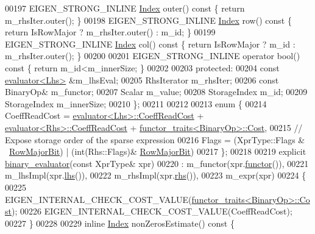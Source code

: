 \begin{DoxyCode}
00197     EIGEN\_STRONG\_INLINE \hyperlink{namespace_eigen_a62e77e0933482dafde8fe197d9a2cfde}{Index} outer()\textcolor{keyword}{ const }\{ \textcolor{keywordflow}{return} m\_rhsIter.outer(); \}
00198     EIGEN\_STRONG\_INLINE \hyperlink{namespace_eigen_a62e77e0933482dafde8fe197d9a2cfde}{Index} row()\textcolor{keyword}{ const }\{ \textcolor{keywordflow}{return} IsRowMajor ? m\_rhsIter.outer() : m\_id; \}
00199     EIGEN\_STRONG\_INLINE \hyperlink{namespace_eigen_a62e77e0933482dafde8fe197d9a2cfde}{Index} col()\textcolor{keyword}{ const }\{ \textcolor{keywordflow}{return} IsRowMajor ? m\_id : m\_rhsIter.outer(); \}
00200 
00201     EIGEN\_STRONG\_INLINE \textcolor{keyword}{operator} bool()\textcolor{keyword}{ const }\{ \textcolor{keywordflow}{return} m\_id<m\_innerSize; \}
00202 
00203   \textcolor{keyword}{protected}:
00204     \textcolor{keyword}{const} \hyperlink{struct_eigen_1_1internal_1_1evaluator}{evaluator<Lhs>} &m\_lhsEval;
00205     RhsIterator m\_rhsIter;
00206     \textcolor{keyword}{const} BinaryOp& m\_functor;
00207     Scalar m\_value;
00208     StorageIndex m\_id;
00209     StorageIndex m\_innerSize;
00210   \};
00211 
00212 
00213   \textcolor{keyword}{enum} \{
00214     CoeffReadCost = \hyperlink{struct_eigen_1_1internal_1_1evaluator}{evaluator<Lhs>::CoeffReadCost} + 
      \hyperlink{struct_eigen_1_1internal_1_1evaluator}{evaluator<Rhs>::CoeffReadCost} + 
      \hyperlink{struct_eigen_1_1internal_1_1functor__traits}{functor\_traits<BinaryOp>::Cost},
00215     \textcolor{comment}{// Expose storage order of the sparse expression}
00216     Flags = (XprType::Flags & ~\hyperlink{group__flags_gae4f56c2a60bbe4bd2e44c5b19cbe8762}{RowMajorBit}) | (\textcolor{keywordtype}{int}(Rhs::Flags)&
      \hyperlink{group__flags_gae4f56c2a60bbe4bd2e44c5b19cbe8762}{RowMajorBit})
00217   \};
00218 
00219   \textcolor{keyword}{explicit} \hyperlink{struct_eigen_1_1internal_1_1binary__evaluator}{binary\_evaluator}(\textcolor{keyword}{const} XprType& xpr)
00220     : m\_functor(xpr.\hyperlink{group___core___module_acc4efe306adbdc0c95cc1c73a8cf81e4}{functor}()),
00221       m\_lhsImpl(xpr.\hyperlink{group___core___module_a0f73e7585dfb54d41c1983e1e6a4b269}{lhs}()),
00222       m\_rhsImpl(xpr.\hyperlink{group___core___module_a3a61cbdf6d1adaa62f012045b04b6d09}{rhs}()),
00223       m\_expr(xpr)
00224   \{
00225     EIGEN\_INTERNAL\_CHECK\_COST\_VALUE(\hyperlink{struct_eigen_1_1internal_1_1functor__traits}{functor\_traits<BinaryOp>::Cost});
00226     EIGEN\_INTERNAL\_CHECK\_COST\_VALUE(CoeffReadCost);
00227   \}
00228 
00229   \textcolor{keyword}{inline} \hyperlink{namespace_eigen_a62e77e0933482dafde8fe197d9a2cfde}{Index} nonZerosEstimate()\textcolor{keyword}{ const }\{

\end{DoxyCode}
